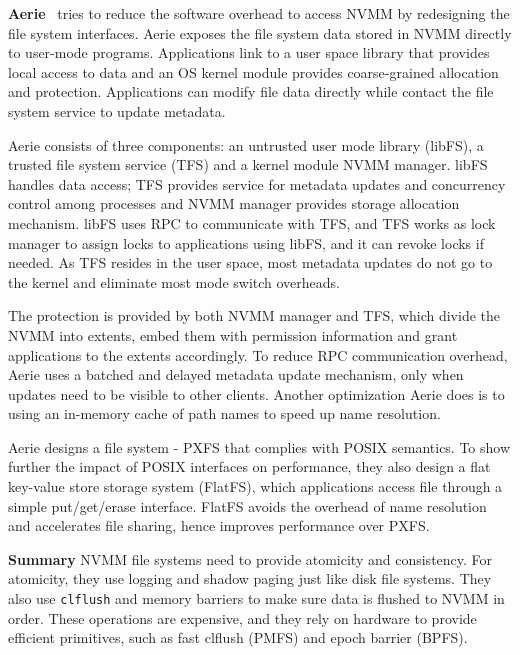 
\textbf{Aerie}~\cite{Aerie} tries to reduce the software overhead to access NVMM
by redesigning the file system interfaces. Aerie exposes the file system
data stored in NVMM directly to user-mode programs. Applications link to
a user space library that provides local access to data and an OS kernel
module provides coarse-grained allocation and protection. Applications can
modify file data directly while contact the file system service to update
metadata.

Aerie consists of three components: an untrusted user mode library (libFS),
a trusted file system service (TFS) and a kernel module NVMM manager. libFS
handles data access; TFS provides service for metadata updates and concurrency
control among processes and NVMM manager provides storage allocation mechanism.
libFS uses RPC to communicate with TFS, and TFS works as lock manager to 
assign locks to applications using libFS, and it can revoke locks if needed.
As TFS resides in the user space, most metadata updates do not go to the kernel
and eliminate most mode switch overheads.

The protection is provided by both NVMM manager and TFS, which divide the NVMM
into extents, embed them with permission information and grant applications
to the extents accordingly. To reduce RPC communication overhead, Aerie
uses a batched and delayed metadata update mechanism, only when updates need to
be visible to other clients. Another optimization Aerie does is to using
an in-memory cache of path names to speed up name resolution.

Aerie designs a file system - PXFS that complies with POSIX semantics.
To show further the impact of POSIX interfaces on performance, they also design 
a flat key-value store storage system (FlatFS), which applications access file
through a simple put/get/erase interface. FlatFS avoids the
overhead of name resolution and accelerates file sharing, hence improves
performance over PXFS.

\textbf{Summary} NVMM file systems need to provide atomicity and consistency.
For atomicity, they use logging and shadow paging just like disk file systems.
They also use \texttt{clflush} and memory barriers to make sure data is
flushed to NVMM in order. These operations are expensive, and they rely
on hardware to provide efficient primitives, such as fast clflush (PMFS) and
epoch barrier (BPFS).

